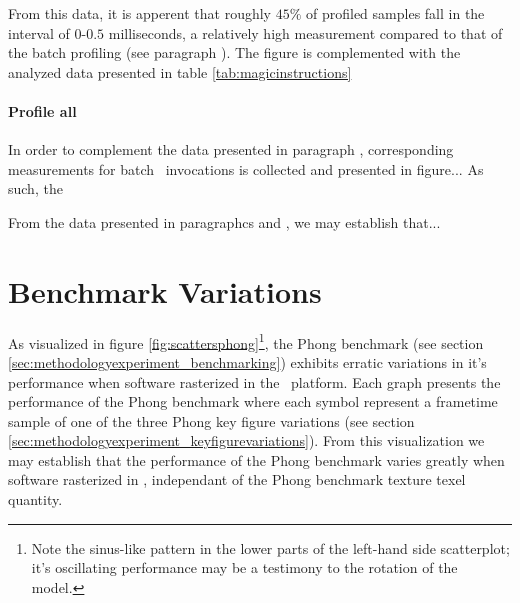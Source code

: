 

From this data, it is apperent that roughly $45\%$ of profiled samples fall in the interval of $0$-$0.5$ milliseconds, a relatively high measurement compared to that of the batch profiling (see paragraph ).
The figure is complemented with the analyzed data presented in table \ref{tab:magicinstructions}



\paragraph{Profile all}
\label{par:results_magicinstructionoverhead_profileall}
In order to complement the data presented in paragraph , corresponding measurements for batch \dvttermmagicinstruction\ invocations is collected and presented in figure...
As such, the 

\noindent
From the data presented in paragraphcs  and , we may establish that...



\section{Benchmark Variations}
\label{sec:results_benchmarkvariations}
As visualized in figure \ref{fig:scattersphong}\footnote{Note the sinus-like pattern in the lower parts of the left-hand side scatterplot; it's oscillating performance may be a testimony to the rotation of the model.}, the Phong benchmark (see section \ref{sec:methodologyexperiment_benchmarking}) exhibits erratic variations in it's performance when software rasterized in the \dvttermsimics\ platform.
Each graph presents the performance of the Phong benchmark where each symbol represent a frametime sample of one of the three Phong key figure variations (see section \ref{sec:methodologyexperiment_keyfigurevariations}).
From this visualization we may establish that the performance of the Phong benchmark varies greatly when software rasterized in \dvttermsimics , independant of the Phong benchmark texture texel quantity.


